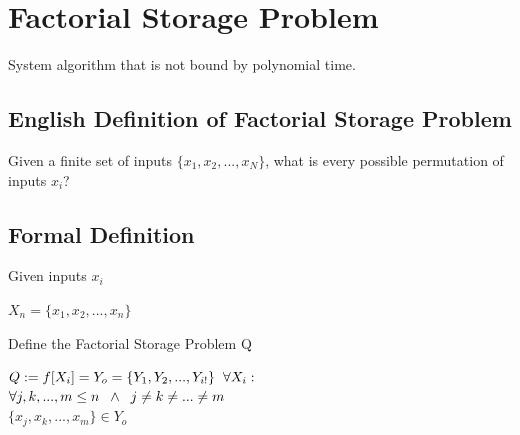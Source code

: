 \documentclass[11pt]{article}
\begin{document}


\newpage
\section{Factorial Storage Problem}
System algorithm that is not bound by polynomial time.
\subsection{English Definition of Factorial Storage Problem}
Given a finite set of inputs $\{x_1,x_2,...,x_N\}$, what is every possible permutation of inputs $x_i$?
\subsection{Formal Definition}
Given inputs $x_i$
\begin{center}
$
X_n = \{x_1,x_2,...,x_n\}
$
\\ \vspace{6mm}
\end{center}
Define the Factorial Storage Problem Q
\begin{center}
$
Q := f[X_i] = Y_o = \{Y_1,Y_2,...,Y_{i!}\} \hspace{2mm} \forall X_i:
$
\\ \vspace{6mm}
$
\forall j,k,...,m \leq n \hspace{2mm} \land \hspace{2mm}  j \neq k \neq ... \neq m
$
\\ \vspace{2mm}
$
\{x_j,x_k,...,x_m\} \in Y_o 
$
\end{center}
\end{document}

